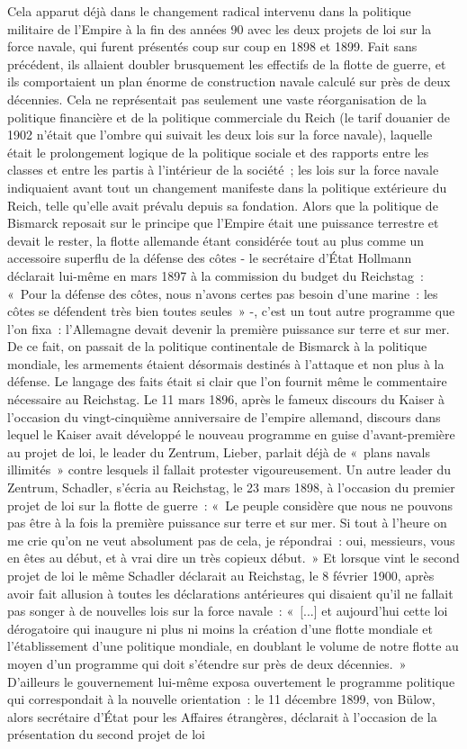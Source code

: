 \documentclass[french,twoside]{book} %
\begin{document}
Cela apparut déjà dans le changement radical intervenu dans la politique militaire de l’Empire à la fin des années 90 avec les deux projets de loi sur la force navale, qui furent présentés coup sur coup en 1898 et 1899. Fait sans précédent, ils allaient doubler brusquement les effectifs de la flotte de guerre, et ils comportaient un plan énorme de construction navale calculé sur près de deux décennies. Cela ne représentait pas seulement une vaste réorganisation de la politique financière et de la politique commerciale du Reich (le tarif douanier de 1902 n’était que l’ombre qui suivait les deux lois sur la force navale), laquelle était le prolongement logique de la politique sociale et des rapports entre les classes et entre les partis à l’intérieur de la société ; les lois sur la force navale indiquaient avant tout un changement manifeste dans la politique extérieure du Reich, telle qu’elle avait prévalu depuis sa fondation. Alors que la politique de Bismarck reposait sur le principe que l’Empire était une puissance terrestre et devait le rester, la flotte allemande étant considérée tout au plus comme un accessoire superflu de la défense des côtes - le secrétaire d’État Hollmann déclarait lui-même en mars 1897 à la commission du budget du Reichstag : « Pour la défense des côtes, nous n’avons certes pas besoin d’une marine : les côtes se défendent très bien toutes seules » -, c’est un tout autre programme que l’on fixa : l’Allemagne devait devenir la première puissance sur terre et sur mer. De ce fait, on passait de la politique continentale de Bismarck à la politique mondiale, les armements étaient désormais destinés à l’attaque et non plus à la défense. Le langage des faits était si clair que l’on fournit même le commentaire nécessaire au Reichstag. Le 11 mars 1896, après le fameux discours du Kaiser à l’occasion du vingt-cinquième anniversaire de l’empire allemand, discours dans lequel le Kaiser avait développé le nouveau programme en guise d’avant-première au projet de loi, le leader du Zentrum, Lieber, parlait déjà de « plans navals illimités » contre lesquels il fallait protester vigoureusement. Un autre leader du Zentrum, Schadler, s’écria au Reichstag, le 23 mars 1898, à l’occasion du premier projet de loi sur la flotte de guerre : « Le peuple considère que nous ne pouvons pas être à la fois la première puissance sur terre et sur mer. Si tout à l’heure on me crie qu’on ne veut absolument pas de cela, je répondrai : oui, messieurs, vous en êtes au début, et à vrai dire un très copieux début. » Et lorsque vint le second projet de loi le même Schadler déclarait au Reichstag, le 8 février 1900, après avoir fait allusion à toutes les déclarations antérieures qui disaient qu’il ne fallait pas songer à de nouvelles lois sur la force navale : « [...] et aujourd’hui cette loi dérogatoire qui inaugure ni plus ni moins la création d’une flotte mondiale et l’établissement d’une politique mondiale, en doublant le volume de notre flotte au moyen d’un programme qui doit s’étendre sur près de deux décennies. » D'ailleurs le gouvernement lui-même exposa  ouvertement le programme politique qui correspondait à la nouvelle orientation : le 11 décembre 1899, von Bülow, alors secrétaire d’État pour les Affaires étrangères, déclarait à l’occasion de la présentation du second projet de loi 
\end{document}
